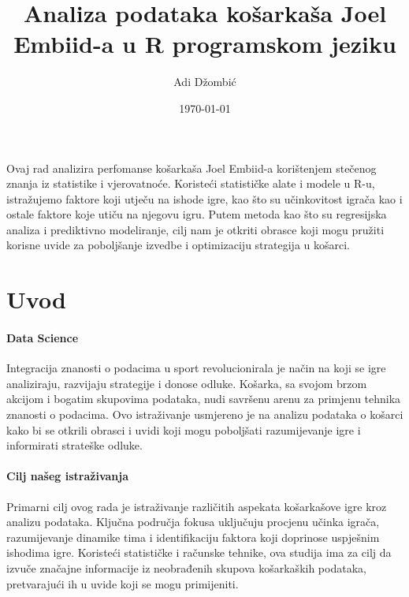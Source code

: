 \documentclass[letterpaper,11pt,leqno]{article}
\begin{document}
\title{Analiza podataka košarkaša Joel Embiid-a u R programskom jeziku}

\author{Adi Džombić}
%


\date{\today}   


\begin{titlepage}
\maketitle

Ovaj rad analizira perfomanse košarkaša Joel Embiid-a korištenjem stečenog znanja iz statistike i vjerovatnoće. Koristeći statističke alate i modele u R-u, istražujemo faktore koji utječu na ishode igre, kao što su učinkovitost igrača kao i ostale faktore koje utiču na njegovu igru. Putem metoda kao što su regresijska analiza i prediktivno modeliranje, cilj nam je otkriti obrasce koji mogu pružiti korisne uvide za poboljšanje izvedbe i optimizaciju strategija u košarci.

\end{titlepage}

\section{Uvod}\label{s:uvod}
 
\paragraph{Data Science} Integracija znanosti o podacima u sport revolucionirala je način na koji se igre analiziraju, razvijaju strategije i donose odluke. Košarka, sa svojom brzom akcijom i bogatim skupovima podataka, nudi savršenu arenu za primjenu tehnika znanosti o podacima. Ovo istraživanje usmjereno je na analizu podataka o košarci kako bi se otkrili obrasci i uvidi koji mogu poboljšati razumijevanje igre i informirati strateške odluke.

\paragraph{Cilj našeg istraživanja} Primarni cilj ovog rada je istraživanje različitih aspekata košarkašove igre kroz analizu podataka. Ključna područja fokusa uključuju procjenu učinka igrača, razumijevanje dinamike tima i identifikaciju faktora koji doprinose uspješnim ishodima igre. Koristeći statističke i računske tehnike, ova studija ima za cilj da izvuče značajne informacije iz neobrađenih skupova košarkaških podataka, pretvarajući ih u uvide koji se mogu primijeniti.
\end{document}
